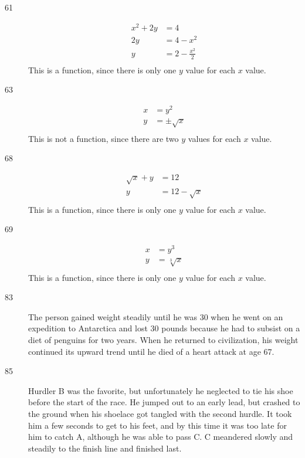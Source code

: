 \documentclass{exam}
\begin{document}
\begin{description}

    \item[61]
      \begin{align*}
        x^2 + 2y &= 4 \\
        2y &= 4 - x^2 \\
        y &= 2 - \frac{x^2}{2} \\
      \end{align*}
      This is a function, since there is only one $y$ value for each $x$ value.

    \item[63]
      \begin{align*}
        x &= y^2 \\
        y &= \pm \sqrt{x} \\
      \end{align*}
      This is not a function, since there are two $y$ values for each $x$ value.

    \item[68]
      \begin{align*}
        \sqrt{x} + y &= 12 \\
        y &= 12 - \sqrt{x} \\
      \end{align*}
      This is a function, since there is only one $y$ value for each $x$ value.

    \item[69]
      \begin{align*}
        x &= y^3 \\
        y &= \sqrt[3]{x} \\
      \end{align*}
      This is a function, since there is only one $y$ value for each $x$ value.

    \item[83]
      The person gained weight steadily until he was 30 when he went on an
      expedition to Antarctica and lost 30 pounds because he had to subsist on a
      diet of penguins for two years.  When he returned to civilization, his
      weight continued its upward trend until he died of a heart attack at age
      67.

    \item[85]
      Hurdler B was the favorite, but unfortunately he neglected to tie his shoe
      before the start of the race.  He jumped out to an early lead, but crashed
      to the ground when his shoelace got tangled with the second hurdle.  It
      took him a few seconds to get to his feet, and by this time it was too
      late for him to catch A, although he was able to pass C.  C meandered
      slowly and steadily to the finish line and finished last.      


\end{description}
\end{document}
